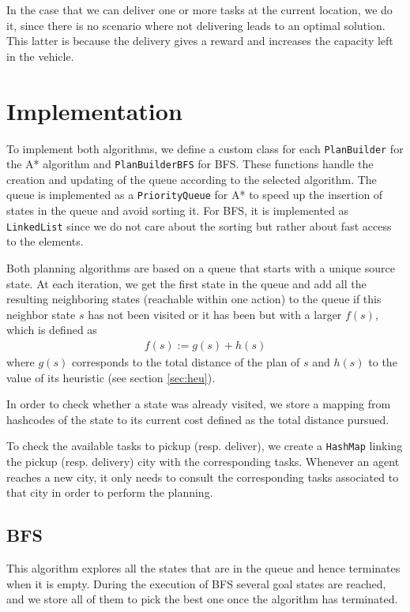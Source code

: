 \documentclass[11pt]{article}
\begin{document}
In the case that we can deliver one or more tasks at the current location, we do it, since there is no scenario where not delivering leads to an optimal solution. This latter is because the delivery gives a reward and increases the capacity left in the vehicle.

\section{Implementation}
To implement both algorithms, we define a custom class for each \verb|PlanBuilder| for the A* algorithm and  \verb|PlanBuilderBFS| for BFS. These functions handle the creation and updating of the queue according to the selected algorithm. The queue is implemented as a \verb|PriorityQueue| for A* to speed up the insertion of states in the queue and avoid sorting it. For BFS, it is implemented as \verb|LinkedList| since we do not care about the sorting but rather about fast access to the elements. 

Both planning algorithms are based on a queue that starts with a unique source state. At each iteration, we get the first state in the queue and add all the resulting neighboring states (reachable within one action) to the queue if this neighbor state $s$ has not been visited or it has been but with a larger $f(s)$, which is defined as
\begin{align}
    f(s) := g(s)+ h(s)
\end{align}
where $g(s)$ corresponds to the total distance of the plan of $s$ and $h(s)$ to the value of its heuristic (see section \ref{sec:heu}).

In order to check whether a state was already visited, we store a mapping from hashcodes of the state to its current cost defined as the total distance pursued.

To check the available tasks to pickup (resp. deliver), we create a \verb|HashMap| linking the pickup (resp. delivery) city with the corresponding tasks. Whenever an agent reaches a new city, it only needs to consult the corresponding tasks associated to that city in order to perform the planning. 

\subsection{BFS}
This algorithm explores all the states that are in the queue and hence terminates when it is empty. During the execution of BFS several goal states are reached, and we store all of them to pick the best one once the algorithm has terminated.
\end{document}
